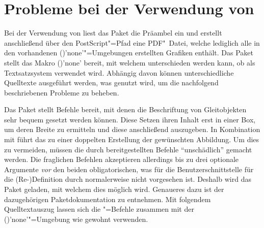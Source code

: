 \section{Probleme bei der Verwendung von }
%
Bei der Verwendung von  liest das Paket  
die Präambel ein und erstellt anschließend über den PostScript"=Pfad 
 eine PDF"~Datei, 
welche lediglich alle in den vorhandenen 
()'none'"=Umgebungen erstellten 
Grafiken enthält. Das Paket  stellt das Makro 
()'none' bereit, mit welchem unterschieden werden 
kann, ob  als Textsatzsystem verwendet wird. Abhängig davon 
können unterschiedliche Quelltexte ausgeführt werden, was genutzt wird, um die 
nachfolgend beschriebenen Probleme zu beheben.
%
\begin{quoting}
\begin{Code}
\usepackage{ifpdf}
\end{Code}
\end{quoting}

Das Paket  stellt Befehle bereit, mit denen die Beschriftung 
von Gleitobjekten sehr bequem gesetzt werden können. Diese Setzen ihren Inhalt 
erst in einer Box, um deren Breite zu ermitteln und diese anschließend 
auszugeben. In Kombination mit  führt das zu einer 
doppelten Erstellung der gewünschten Abbildung. Um dies zu vermeiden, müssen 
die durch  bereitgestellten Befehle \enquote{unschädlich} 
gemacht werden. Die fraglichen Befehlen akzeptieren allerdings bis zu drei 
optionale Argumente \emph{vor} den beiden obligatorischen, was für die 
Benutzerschnittstelle für die (Re-)Definition durch  
normalerweise nicht vorgesehen ist. Deshalb wird das Paket  
geladen, mit welchem dies möglich wird. Genaueres dazu ist der dazugehörigen 
Paketdokumentation zu entnehmen. Mit folgendem Quelltextauszug lassen sich die 
"=Befehle zusammen mit der 
()'none'"=Umgebung wie gewohnt 
verwenden.
%
\begin{quoting}
\begin{Code}
\usepackage{floatrow}
\usepackage{xparse}
\ifpdf\else
\fi
\end{Code}
\end{quoting}

